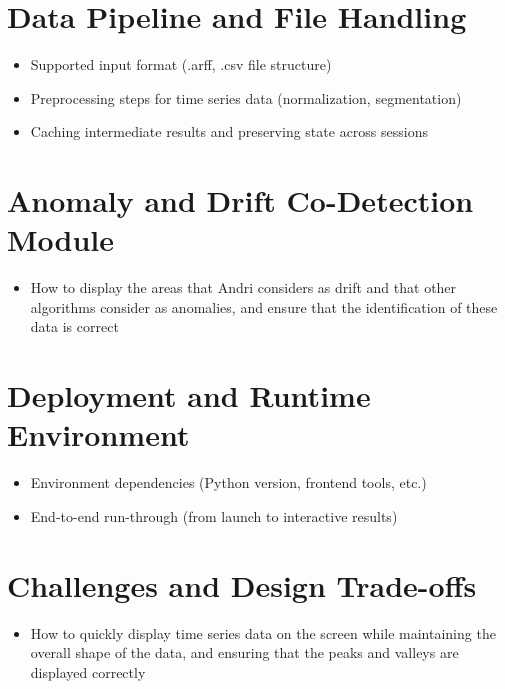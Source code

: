 \section{Data Pipeline and File Handling}
\begin{itemize}
    \item Supported input format (.arff, .csv file structure)
    \item Preprocessing steps for time series data (normalization, segmentation)
    \item Caching intermediate results and preserving state across sessions
\end{itemize}

\section{Anomaly and Drift Co-Detection Module}
\begin{itemize}
    \item How to display the areas that Andri considers as drift and that other algorithms consider as anomalies, and ensure that the identification of these data is correct
\end{itemize}


\section{Deployment and Runtime Environment}
\begin{itemize}
    \item Environment dependencies (Python version, frontend tools, etc.)
    \item End-to-end run-through (from launch to interactive results)
\end{itemize}

\section{Challenges and Design Trade-offs}
\begin{itemize}
    \item How to quickly display time series data on the screen while maintaining the overall shape of the data, and ensuring that the peaks and valleys are displayed correctly
\end{itemize}